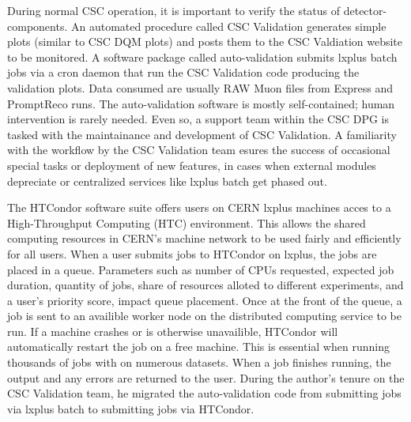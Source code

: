 During normal CSC operation, it is important to verify the status of detector-components. An automated procedure called CSC Validation generates simple plots (similar to CSC DQM plots) and posts them to the CSC Valdiation website to be monitored. A software package called auto-validation submits lxplus batch jobs via a cron daemon that run the CSC Validation code producing the validation plots. Data consumed are usually RAW Muon files from Express and PromptReco runs. The auto-validation software is mostly self-contained; human intervention is rarely needed. Even so, a support team within the CSC DPG is tasked with the maintainance and development of CSC Validation. A familiarity with the workflow by the CSC Validation team esures the success of occasional special tasks or deployment of new features, in cases when external modules depreciate or centralized services like lxplus batch get phased out. 

The HTCondor software suite offers users on CERN lxplus machines acces to a High-Throughput Computing (HTC) environment. This allows the shared computing resources in CERN's machine network to be used fairly and efficiently for all users. When a user submits jobs to HTCondor on lxplus, the jobs are placed in a queue. Parameters such as number of CPUs requested, expected job duration, quantity of jobs, share of resources alloted to different experiments, and a user's priority score, impact queue placement. Once at the front of the queue, a job is sent to an availible worker node on the distributed computing service to be run. If a machine crashes or is otherwise unavailible, HTCondor will automatically restart the job on a free machine. This is essential when running thousands of jobs with on numerous datasets. When a job finishes running, the output and any errors are returned to the user. During the author's tenure on the CSC Validation team, he migrated the auto-validation code from submitting jobs via lxplus batch to submitting jobs via HTCondor. 
